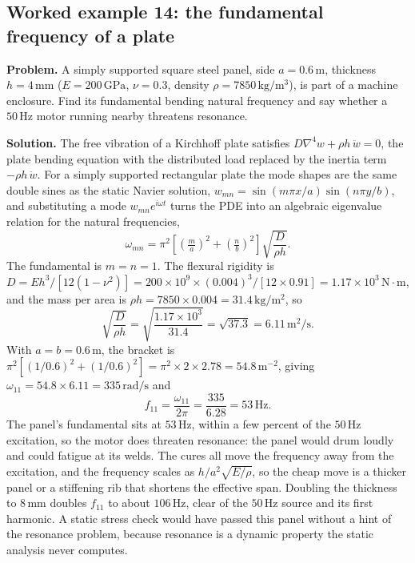 \subsection*{Worked example 14: the fundamental frequency of a plate}

\textbf{Problem.} A simply supported square steel panel, side $a = 0.6\,
\si{\meter}$, thickness $h = 4\,\si{\milli\meter}$ ($E = 200\,\text{GPa}$,
$\nu = 0.3$, density $\rho = 7850\,\si{\kilogram\per\meter\cubed}$), is part
of a machine enclosure. Find its fundamental bending natural frequency and
say whether a $50\,\text{Hz}$ motor running nearby threatens resonance.

\textbf{Solution.} The free vibration of a Kirchhoff plate satisfies
$D\nabla^4 w + \rho h\, \ddot w = 0$, the plate bending equation with the
distributed load replaced by the inertia term $-\rho h\,\ddot w$. For a
simply supported rectangular plate the mode shapes are the same double
sines as the static Navier solution, $w_{mn} = \sin(m\pi x/a)\sin(n\pi y/b)$,
and substituting a mode $w_{mn}e^{i\omega t}$ turns the PDE into an
algebraic eigenvalue relation for the natural frequencies,
\[
\omega_{mn} = \pi^2\!\left[\left(\tfrac{m}{a}\right)^2
+ \left(\tfrac{n}{b}\right)^2\right]\sqrt{\frac{D}{\rho h}}.
\]
The fundamental is $m = n = 1$. The flexural rigidity is $D = E h^3/
[12(1-\nu^2)] = 200\times 10^9\times (0.004)^3/[12\times 0.91] = 1.17\times
10^3\,\text{N}\cdot\text{m}$, and the mass per area is $\rho h = 7850\times
0.004 = 31.4\,\si{\kilogram\per\meter\squared}$, so
\[
\sqrt{\frac{D}{\rho h}} = \sqrt{\frac{1.17\times 10^3}{31.4}}
= \sqrt{37.3} = 6.11\,\text{m}^2/\text{s}.
\]
With $a = b = 0.6\,\si{\meter}$, the bracket is $\pi^2[(1/0.6)^2 +
(1/0.6)^2] = \pi^2\times 2\times 2.78 = 54.8\,\text{m}^{-2}$, giving
$\omega_{11} = 54.8\times 6.11 = 335\,\text{rad/s}$ and
\[
f_{11} = \frac{\omega_{11}}{2\pi} = \frac{335}{6.28} = 53\,\text{Hz}.
\]
The panel's fundamental sits at $53\,\text{Hz}$, within a few percent of
the $50\,\text{Hz}$ excitation, so the motor does threaten resonance: the
panel would drum loudly and could fatigue at its welds. The cures all move
the frequency away from the excitation, and the frequency scales as
$h/a^2\sqrt{E/\rho}$, so the cheap move is a thicker panel or a stiffening
rib that shortens the effective span. Doubling the thickness to $8\,\si{
\milli\meter}$ doubles $f_{11}$ to about $106\,\text{Hz}$, clear of the
$50\,\text{Hz}$ source and its first harmonic. A static stress check would
have passed this panel without a hint of the resonance problem, because
resonance is a dynamic property the static analysis never computes.

